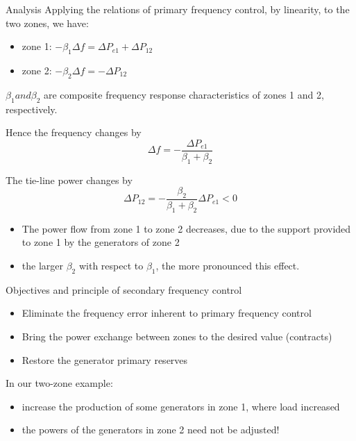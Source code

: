 \begin{frame}[allowframebreaks]{Analysis}
  Applying the relations of primary frequency control, by linearity, to the two zones, we have:
  \begin{itemize}
      \item zone 1: $-\beta_1 \Delta f = \Delta P_{e1} + \Delta P_{12}$ 
      \item zone 2: $-\beta_2 \Delta f = -\Delta P_{12}$ 
  \end{itemize}
   $\beta_1 and  \beta_2$ are composite frequency response characteristics of zones 1 and 2, respectively.
    
   Hence the frequency changes by $$\Delta f = -\frac{\Delta P_{e1}}{\beta_1 + \beta_2}$$

   The tie-line power changes by $$\Delta P_{12} = -\frac{\beta_2}{\beta_1 + \beta_2} \Delta P_{e1} < 0$$
   \begin{itemize}
      \item The power flow from zone 1 to zone 2 decreases, due to the support provided to zone 1 by the generators of zone 2 
      \item the larger $\beta_2$ with respect to $\beta_1$, the more pronounced this effect.
    \end{itemize}
\end{frame}



\begin{frame}{Objectives and principle of secondary frequency control}
    \begin{itemize}
        \item Eliminate the frequency error inherent to primary frequency control 
        \item Bring the power exchange between zones to the desired value (contracts) 
        \item Restore the generator primary reserves 
    \end{itemize}

In our two-zone example: 
\begin{itemize}
    \item increase the production of some generators in zone 1, where load increased 
    \item the powers of the generators in zone 2 need not be adjusted! 
\end{itemize}

\end{frame}

